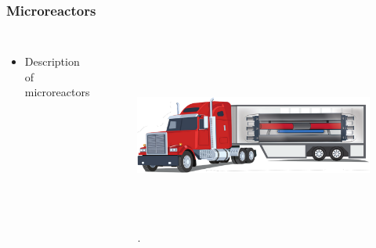 \begin{frame}
\frametitle{Microreactors}
\begin{columns}
	\column[t]{5cm}
	\begin{itemize}
		\item Description of microreactors
	\end{itemize}

    \column[t]{5cm}
	\begin{figure}[htbp!]
		\begin{center}
			\includegraphics[height=6.2cm]{images/microreactor}
		\end{center}
		\caption{.}
	\end{figure}
\end{columns}
\end{frame}

